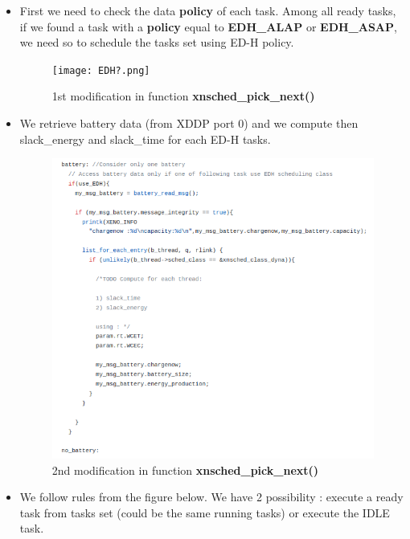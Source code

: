 \documentclass[12pt,hidelinks]{article}
\begin{document}
{	\begin{itemize}
	    \item First we need to check the data \textbf{policy} of each task. Among all ready tasks, if we found a task with a \textbf{policy} equal to \textbf{EDH\_ALAP} or \textbf{EDH\_ASAP}, we need so to schedule the tasks set using ED-H policy. 
	    
	    \begin{figure}[ht]
        \centering
    	\texttt{[image: EDH?.png]}
    	\caption{1st modification in function \textbf{xnsched\_pick\_next()}}
    	\end{figure} \newline
	    
	    \newpage \item We retrieve battery data (from XDDP port 0) and we compute then slack\_energy and slack\_time for each ED-H tasks.
	    
	    \begin{figure}[!h]
        \centering
    	\includegraphics[scale=1]{batteryData.png}
    	\caption{2nd modification in function \textbf{xnsched\_pick\_next()}}
    	\end{figure} \newline
	    
	    \newpage \item We follow rules from the figure below. We have 2 possibility : execute a ready task from tasks set (could be the same running tasks) or execute the IDLE task.
    	

\end{itemize}}
\end{document}
